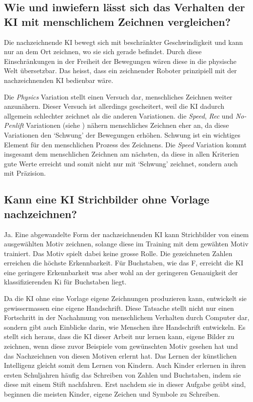 

\subsection{Wie und inwiefern lässt sich das Verhalten der KI mit menschlichem Zeichnen vergleichen?}\label{subsub:d_frage_unter_5}

Die nachzeichnende KI bewegt sich mit beschränkter Geschwindigkeit und kann nur
an dem Ort zeichnen, wo sie sich gerade befindet. Durch diese Einschränkungen in
der Freiheit der Bewegungen wären diese in die physische Welt übersetzbar.  Das
heisst, dass ein zeichnender Roboter prinzipiell mit der nachzeichnenden KI
bedienbar wäre.

Die \emph{Physics} Variation stellt einen Versuch dar, menschliches Zeichnen
weiter anzunähern. Dieser Versuch ist allerdings gescheitert, weil die KI
dadurch allgemein schlechter zeichnet als die anderen Variationen. die
\emph{Speed}, \emph{Rec} und \emph{No-Penlift} Variationen (siehe
) nähern menschliches Zeichnen eher an, da diese Variationen
den `Schwung' der Bewegungen erhöhen. Schwung ist ein wichtiges Element für den
menschlichen Prozess des Zeichnens. Die \emph{Speed} Variation kommt insgesamt
dem menschlichen Zeichnen am nächsten, da diese in allen Kriterien gute Werte
erreicht und somit nicht nur mit `Schwung' zeichnet, sondern auch mit Präzision.


\subsection{Kann eine KI Strichbilder ohne Vorlage
nachzeichnen?}\label{subsub:d_frage_unter_6} Ja. Eine abgewandelte Form der
nachzeichnenden KI kann Strichbilder von einem ausgewählten Motiv zeichnen,
solange diese im Training mit dem gewähten Motiv trainiert. Das Motiv spielt
dabei keine grosse Rolle. Die gezeichneten Zahlen erreichen die höchste
Erkennbarkeit. Für Buchstaben, wie das F, erreicht die KI eine geringere
Erkennbarkeit was aber wohl an der geringeren Genauigkeit der klassifizierenden
Ki für Buchstaben liegt.

Da die KI ohne eine Vorlage eigene Zeichnungen produzieren kann, entwickelt sie
gewissermassen eine eigene Handschrift. Diese Tatsache stellt nicht nur einen
Fortschritt in der Nachahmung von menschlichem Verhalten durch Computer dar,
sondern gibt auch Einblicke darin, wie Menschen ihre Handschrift entwickeln. Es
stellt sich heraus, dass die KI dieser Arbeit nur lernen kann, eigene Bilder zu
zeichnen, wenn diese zuvor Beispiele vom gewünschten Motiv gesehen hat und das
Nachzeichnen von diesen Motiven erlernt hat. Das Lernen der künstlichen
Intelligenz gleicht somit dem Lernen von Kindern. Auch Kinder erlernen in ihren
ersten Schuljahren häufig das Schreiben von Zahlen und Buchstaben, indem sie
diese mit einem Stift nachfahren. Erst nachdem sie in dieser Aufgabe geübt sind,
beginnen die meisten Kinder, eigene Zeichen und Symbole zu Schreiben.


